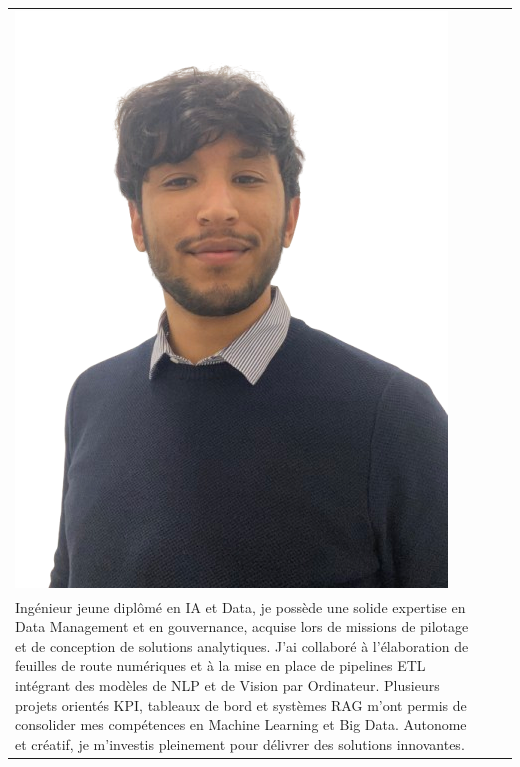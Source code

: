 \documentclass[a4paper,11pt]{article}
\newcommand{\name}{Mohamed BACHAR}
\begin{document}
\selectfont

\begin{tabularx}{\linewidth}{@{}l X r@{}}
  \begin{minipage}{0.15\linewidth}
    \includegraphics[width=\linewidth]{photo.png}
    
  \end{minipage}
  \hspace{1mm}
  &
  \begin{minipage}{\linewidth}
    \raggedright
    \textbf{\Large \name} \\
    {

Ingénieur jeune diplômé en IA et Data, je possède une solide expertise en Data Management et en gouvernance, acquise lors de missions de pilotage et de conception de solutions analytiques. J’ai collaboré à l’élaboration de feuilles de route numériques et à la mise en place de pipelines ETL intégrant des modèles de NLP et de Vision par Ordinateur. Plusieurs projets orientés KPI, tableaux de bord et systèmes RAG m’ont permis de consolider mes compétences en Machine Learning et Big Data. Autonome et créatif, je m’investis pleinement pour délivrer des solutions innovantes.
    }
    
  \end{minipage}
\end{tabularx}
\end{document}
